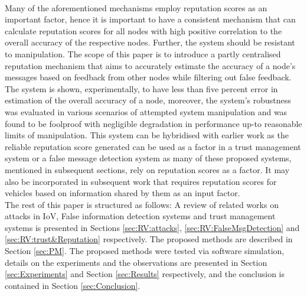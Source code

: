 \documentclass[journal]{IEEEtran}
\begin{document}
\\Many of the aforementioned mechanisms employ reputation scores as an important factor, hence it is important to have a consistent mechanism that can calculate reputation scores for all nodes with high positive correlation to the overall accuracy of the respective nodes. Further, the system should be resistant to manipulation. The scope of this paper is to introduce a partly centralised reputation mechanism that aims to accurately estimate the accuracy of a node's messages based on feedback from other nodes while filtering out false feedback. The system is shown, experimentally, to have less than five percent error in estimation of the overall accuracy of a node, moreover, the system's robustness was evaluated in various scenarios of attempted system manipulation and was found to be foolproof with negligible degradation in performance up-to reasonable limits of manipulation. This system can be hybridised with earlier work as the reliable reputation score generated can be used as a factor in a trust management system or a false message detection system as many of these proposed systems, mentioned in subsequent sections, rely on reputation scores as a factor. It may also be incorporated in subsequent work that requires reputation scores for vehicles based on information shared by them as an input factor.
\\The rest of this paper is structured as follows: A review of related works on attacks in IoV, False information detection systems and trust management systems is presented in Sections \ref{sec:RV:attacks}, \ref{sec:RV:FalseMsgDetection} and \ref{sec:RV:trust&Reputation} respectively. The proposed methods are described in Section \ref{sec:PM}. The proposed methods were tested via software simulation, details on the experiments and the observations are presented in Section \ref{sec:Experiments} and Section \ref{sec:Results} respectively, and the conclusion is contained in Section \ref{sec:Conclusion}.

 


\end{document}
